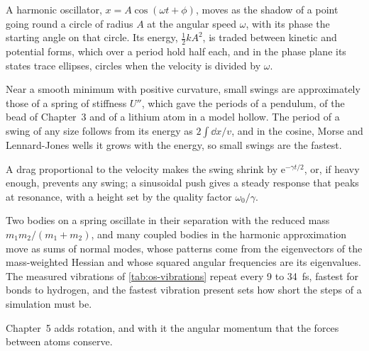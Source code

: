 
A harmonic oscillator, $x = A\cos(\omega t + \phi)$, moves as the shadow of
a point going round a circle of radius $A$ at the angular speed $\omega$,
with its phase the starting angle on that circle. Its energy, $\frac12
kA^2$, is traded between kinetic and potential forms, which over a period
hold half each, and in the phase plane its states trace ellipses, circles
when the velocity is divided by $\omega$.

Near a smooth minimum with positive curvature, small swings are
approximately those of a spring of stiffness $U''$, which gave
the periods of a pendulum, of the bead of Chapter~3 and of a lithium atom
in a model hollow. The period of a swing of any size follows from its
energy as $2\int\dd x/v$, and in the cosine, Morse and Lennard-Jones wells
it grows with the energy, so small swings are the fastest.

A drag
proportional to the velocity makes the swing shrink by $\mathrm{e}^{-\gamma
t/2}$, or, if heavy enough, prevents any swing; a sinusoidal push gives a
steady response that peaks at resonance, with a height set by the quality
factor $\omega_0/\gamma$.

Two bodies on a spring oscillate in their
separation with the reduced mass $m_1m_2/(m_1 + m_2)$, and many coupled
bodies in the harmonic approximation move as sums of normal modes, whose patterns come from the
eigenvectors of the mass-weighted Hessian and whose squared angular
frequencies are its eigenvalues. The measured vibrations of
\cref{tab:os-vibrations} repeat every 9 to \SI{34}{\femto\second}, fastest
for bonds to hydrogen, and the fastest vibration present sets how short
the steps of a simulation must be.

Chapter~5 adds rotation, and with it the angular momentum that the forces
between atoms conserve.
